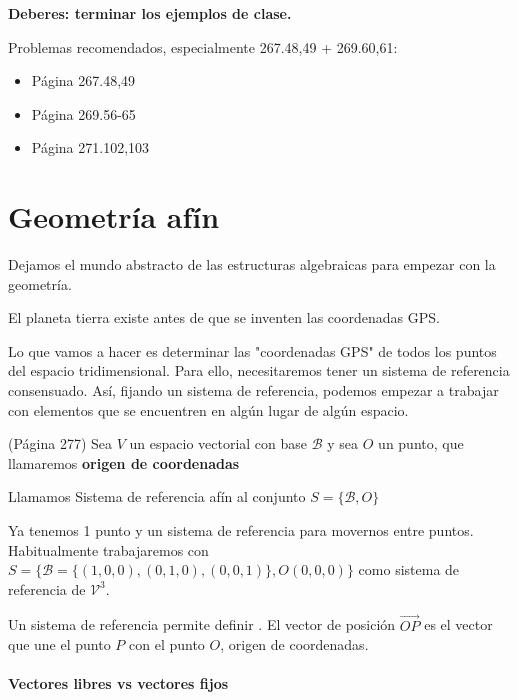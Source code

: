 \textbf{Deberes: terminar los ejemplos de clase.}

Problemas recomendados, especialmente 267.48,49 + 269.60,61: 
\begin{itemize}
  \item Página 267.48,49
  \item Página 269.56-65
  \item Página 271.102,103
\end{itemize}

\section{Geometría afín}

Dejamos el mundo abstracto de las estructuras algebraicas para empezar con la geometría. 

El planeta tierra existe antes de que se inventen las coordenadas GPS. 


Lo que vamos a hacer es determinar las "coordenadas GPS" de todos los puntos del espacio tridimensional.
%
Para ello, necesitaremos tener un sistema de referencia consensuado.
%
Así, fijando un sistema de referencia, podemos empezar a trabajar con elementos que se encuentren en algún lugar de algún espacio. 


\begin{defn} (Página 277)
Sea $V$ un espacio vectorial con base $\mathcal{B}$ y sea $O$ un punto, que llamaremos \textbf{origen de coordenadas}

Llamamos Sistema de referencia afín al conjunto $S = \{\mathcal{B},O\}$
\end{defn}

\obs Ya tenemos 1 punto y un sistema de referencia para movernos entre puntos. Habitualmente trabajaremos con $S= \{ \mathcal{B} = \{(1,0,0), (0,1,0), (0,0,1)\}, O(0,0,0)\}$ como sistema de referencia de $\mathcal{V}^3$.

Un sistema de referencia permite definir .
%
El vector de posición $\vec{OP}$ es el vector que une el punto $P$ con el punto $O$, origen de coordenadas.

\paragraph{Vectores libres vs vectores fijos}


